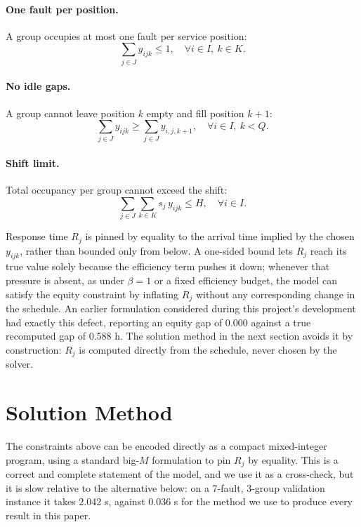 \documentclass[11pt]{article}
\begin{document}
\paragraph{One fault per position.} A group occupies at most one fault per service position:
\begin{equation}
\sum_{j \in J} y_{ijk} \leq 1, \quad \forall i \in I,\ k \in K.
\end{equation}

\paragraph{No idle gaps.} A group cannot leave position $k$ empty and fill position $k+1$:
\begin{equation}
\sum_{j \in J} y_{ijk} \geq \sum_{j \in J} y_{i,j,k+1}, \quad \forall i \in I,\ k < Q.
\end{equation}

\paragraph{Shift limit.} Total occupancy per group cannot exceed the shift:
\begin{equation}
\sum_{j \in J}\sum_{k \in K} s_j\, y_{ijk} \leq H, \quad \forall i \in I.
\end{equation}

Response time $R_j$ is pinned by equality to the arrival time implied by the chosen $y_{ijk}$, rather than bounded only from below. A one-sided bound lets $R_j$ reach its true value solely because the efficiency term pushes it down; whenever that pressure is absent, as under $\beta=1$ or a fixed efficiency budget, the model can satisfy the equity constraint by inflating $R_j$ without any corresponding change in the schedule. An earlier formulation considered during this project's development had exactly this defect, reporting an equity gap of 0.000 against a true recomputed gap of 0.588 h. The solution method in the next section avoids it by construction: $R_j$ is computed directly from the schedule, never chosen by the solver.

\section*{Solution Method}

The constraints above can be encoded directly as a compact mixed-integer program, using a standard big-$M$ formulation to pin $R_j$ by equality. This is a correct and complete statement of the model, and we use it as a cross-check, but it is slow relative to the alternative below: on a 7-fault, 3-group validation instance it takes 2.042 s, against 0.036 s for the method we use to produce every result in this paper.
\end{document}
